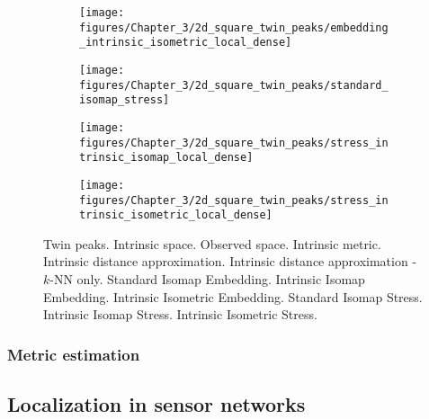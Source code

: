 \documentclass[final,supplement]{siamart1116}
\begin{document}
\begin{figure}[h]
\begin{centering}
\begin{subfigure}[b]{0.32\linewidth}
			\texttt{[image: figures/Chapter\_3/2d\_square\_twin\_peaks/embedding\_intrinsic\_isometric\_local\_dense]}
			\caption{\label{fig:punctured_severed_sphere_intrinsic_isometric_embedding2}}
		\end{subfigure}
	\end{centering}
	\begin{centering}
		\begin{subfigure}[b]{0.32\linewidth}
			\texttt{[image: figures/Chapter\_3/2d\_square\_twin\_peaks/standard\_isomap\_stress]}
			\caption{\label{fig:punctured_severed_sphere_standard_isomap_stress2}}
		\end{subfigure}
		\hfill
		\begin{subfigure}[b]{0.32\linewidth}
			\texttt{[image: figures/Chapter\_3/2d\_square\_twin\_peaks/stress\_intrinsic\_isomap\_local\_dense]}
			\caption{\label{fig:punctured_severed_sphere_intrinsic_isomap_stress2}}
		\end{subfigure}
		\hfill
		\begin{subfigure}[b]{0.32\linewidth}
			\texttt{[image: figures/Chapter\_3/2d\_square\_twin\_peaks/stress\_intrinsic\_isometric\_local\_dense]}
			\caption{\label{fig:punctured_severed_sphere_intrinsic_isometric_stress2}}
		\end{subfigure}
	\end{centering}
	\caption{\label{fig:punctured_severed_sphere2} Twin peaks. \protect{} Intrinsic space. 
		\protect{} Observed space. 
		\protect{} Intrinsic metric. 
		\protect{} Intrinsic distance approximation.
		\protect{} Intrinsic distance approximation - $k$-NN only.
		\protect{} Standard Isomap Embedding.
		\protect{} Intrinsic Isomap Embedding.
		\protect{} Intrinsic Isometric Embedding.
		\protect{} Standard Isomap Stress.
		\protect{} Intrinsic Isomap Stress.
		\protect{} Intrinsic Isometric Stress.
	}
\end{figure}

\subsubsection{Metric estimation}
\label{ssec:Additional-results-Metric estimation}

\subsection{Localization in sensor networks}
\label{ssec:additional-results-localization}



\end{document}
